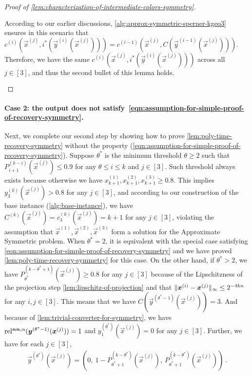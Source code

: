 \begin{proof}[Proof of \cref{lem:characterization-of-intermediate-colors-symmetry}]
\begin{itemize}[itemsep=0.2em,topsep=0.5em]
        According to our earlier discussions, \cref{alg:approx-symmetric-sperner-kgeq3} ensures in this scenario that $c^{(i)}(\vec{x}^{(j)}, i^*(\vec{y}^{(i)}(\vec{x}^{(j)}))) = c^{(i-1)}(\vec{x}^{(j)}, C(\vec{y}^{(i-1)}(\vec{x}^{(j)})))$.
        Therefore, we have the same $c^{(i)}(\vec{x}^{(j)}, i^*(\vec{y}^{(i)}(\vec{x}^{(j)})))$ across all $j\in [3]$, and thus the second bullet of this lemma holds. \qedhere
    \end{itemize}
\end{proof}

\paragraph{Case 2: the output does not satisfy~\cref{eqn:assumption-for-simple-proof-of-recovery-symmetry}.}
Next, we complete our second step by showing how to prove \cref{lem:poly-time-recovery-symmetry} without the property (\cref{eqn:assumption-for-simple-proof-of-recovery-symmetry}). 
Suppose $\theta^*$ is the minimum threshold $\theta\geq 2$ such that $P_{i+1}^{(k-i)}(\vec{x}^{(j)})\leq 0.9$ for any $\theta\leq i\leq k$ and $j\in[3]$. 
Such threshold always exists because otherwise we have $x^{(1)}_{k+1}, x^{(2)}_{k+1}, x^{(3)}_{k+1}\geq 0.8$. 
This implies $y_3^{(k)}(\vec{x}^{(j)})>0.8$ for any $j\in [3]$, and according to our construction of the base instance (\cref{alg:base-instance}), we have $C^{(k)}(\vec{x}^{(j)})=c^{(k)}_3(\vec{x}^{(j)}) = k+1$ for any $j\in[3]$, violating the assumption that $\vec{x}^{(1)}, \vec{x}^{(2)}, \vec{x}^{(3)}$ form a solution for the \outofk Approximate Symmetric \Sperner problem. 
When $\theta^*=2$, it is equivalent with the special case satisfying \cref{eqn:assumption-for-simple-proof-of-recovery-symmetry} and we have proved \cref{lem:poly-time-recovery-symmetry} for this case.
On the other hand, if $\theta^*>2$, we have $P^{(k-\theta^*+1)}_{\theta^*}(\vec{x}^{(j)})\geq 0.8$ for any $j\in [3]$ because of the Lipschitzness of the projection step \cref{lem:lipschitz-of-projection} and that $\| {\boldsymbol{x}^{(i)}-\boldsymbol{x}^{(j)}} \|_{\infty}\leq 2^{-4kn}$ for any $i,j\in [3]$. 
This means that we have $C(\vec{y}^{(\theta^*-1)}(\vec{x}^{(j)}))=3$.
And because of \cref{lem:trivial-converter-for-symmetry}, we have $\operatorname*{rel^{\boldsymbol{nn},\alpha}}(\boldsymbol{y}^{(\theta^*-1)}(\boldsymbol{x}^{(j)}))=1$ and $y_1^{(\theta^*)}(\vec{x}^{(j)})=0$ for any $j\in [3]$. 
Further, we have for each $j\in [3]$,
\begin{align}
    \label{eqn:y-theta-star}
    \vec{y}^{(\theta^*)}(\vec{x}^{(j)})=\left(0,\ 1-P^{(k-\theta^*)}_{\theta^*+1}(\vec{x}^{(j)}),\ P^{(k-\theta^*)}_{\theta^*+1}(\vec{x}^{(j)})\right)~.
\end{align}
